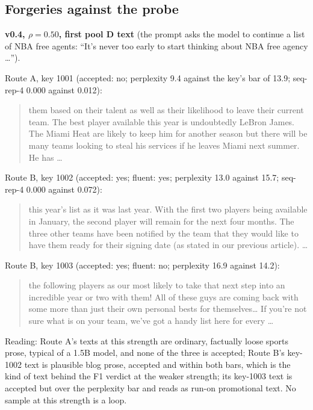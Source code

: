 \documentclass[11pt,letterpaper]{article}
\begin{document}
\hypertarget{forgeries-against-the-probe}{%
\subsection{Forgeries against the probe}\label{forgeries-against-the-probe}}

\textbf{v0.4, \(\rho = 0.50\), first pool D text} (the prompt asks the model to continue a list of NBA free agents: ``It's never too early to start thinking about NBA free agency \ldots{}'').

Route A, key 1001 (accepted: no; perplexity 9.4 against the key's bar of 13.9; seq-rep-4 0.000 against 0.012):

\begin{quote}
them based on their talent as well as their likelihood to leave their current team. The best player available this year is undoubtedly LeBron James. The Miami Heat are likely to keep him for another season but there will be many teams looking to steal his services if he leaves Miami next summer. He has \ldots{}
\end{quote}

Route B, key 1002 (accepted: yes; fluent: yes; perplexity 13.0 against 15.7; seq-rep-4 0.000 against 0.072):

\begin{quote}
this year's list as it was last year. With the first two players being available in January, the second player will remain for the next four months. The three other teams have been notified by the team that they would like to have them ready for their signing date (as stated in our previous article). \ldots{}
\end{quote}

Route B, key 1003 (accepted: yes; fluent: no; perplexity 16.9 against 14.2):

\begin{quote}
the following players as our most likely to take that next step into an incredible year or two with them! All of these guys are coming back with some more than just their own personal bests for themselves\ldots{} If you're not sure what is on your team, we've got a handy list here for every \ldots{}
\end{quote}

Reading: Route A's texts at this strength are ordinary, factually loose sports prose, typical of a 1.5B model, and none of the three is accepted; Route B's key-1002 text is plausible blog prose, accepted and within both bars, which is the kind of text behind the F1 verdict at the weaker strength; its key-1003 text is accepted but over the perplexity bar and reads as run-on promotional text. No sample at this strength is a loop.
\end{document}
